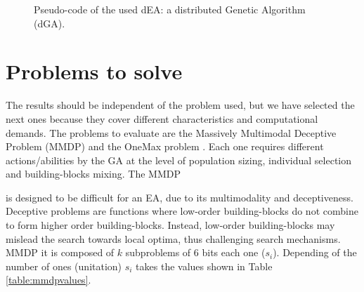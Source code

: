 \begin{SCfigure}[20][htb]
\usebox{\algoadaptativebox}
\caption{Pseudo-code of the used dEA: a distributed Genetic Algorithm (dGA).}
\label{fig:EAused}
\end{SCfigure}




\section{Problems to solve}

The results should be independent of the problem used, but we have selected the next ones because they cover different characteristics and computational demands. The problems to evaluate are the Massively Multimodal Deceptive
Problem (MMDP) \cite{goldberg92massive} and the OneMax problem
\cite{SchafferOnemax91}. Each one requires different actions/abilities by the GA
at the level of population sizing, individual selection and
building-blocks mixing. The MMDP

 is designed to be difficult for an EA, due to
its multimodality and deceptiveness. Deceptive problems are functions where low-order building-blocks do not combine to form higher order building-blocks. Instead, low-order building-blocks may mislead the search towards local optima, thus challenging search mechanisms. MMDP it is composed of $k$ subproblems of 6 bits each one ($s_i$). Depending of
the number of ones (unitation) $s_i$ takes the values shown in Table \ref{table:mmdpvalues}.  

\begin{SCtable}[][t]
\caption{ Basic deceptive bipolar function ($s_i$) for MMDP.}
\label{table:mmdpvalues}

\end{SCtable}



